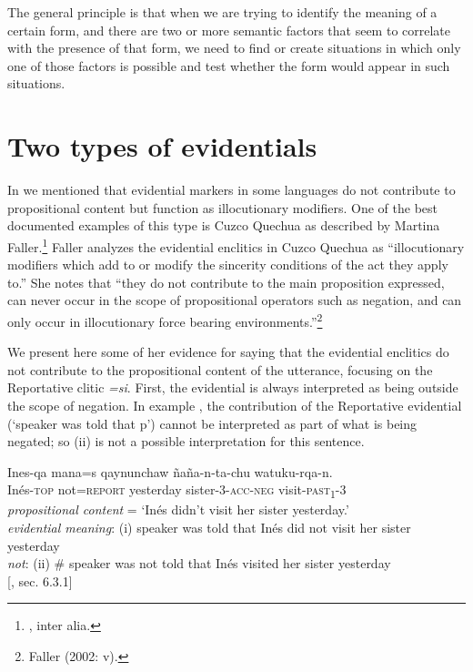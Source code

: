The general principle is that when we are trying to identify the meaning of a certain form, and there are two or more semantic factors that seem to correlate with the presence of that form, we need to find or create situations in which only one of those factors is possible and test whether the form would appear in such situations.


\section{Two types of evidentials}\label{sec:17.5}

In  we mentioned that evidential markers in some languages do not contribute to propositional content but function as illocutionary modifiers. One of the best documented examples of this type is Cuzco Quechua as described by Martina Faller.\footnote{\citet{Faller2002,Faller2003,Faller2006}, inter alia.} Faller analyzes the evidential enclitics in Cuzco Quechua as “illocutionary modifiers which add to or modify the sincerity conditions of the act they apply to.” She notes that “they do not contribute to the main proposition expressed, can never occur in the scope of propositional operators such as negation, and can only occur in illocutionary force bearing environments.”\footnote{Faller (2002: v).}



We present here some of her evidence for saying that the evidential enclitics do not contribute to the propositional content of the utterance, focusing on the Reportative clitic \textit{=si}. First, the evidential is always interpreted as being outside the scope of negation. In example , the contribution of the Reportative evidential (‘speaker was told that p’) cannot be interpreted as part of what is being negated; so (ii) is not a possible interpretation for this sentence.


\ea
\gll Ines-qa  mana=s  qaynunchaw  ñaña-n-ta-chu  watuku-rqa-n.\\
Inés-\textsc{top}  not=\textsc{report}  yesterday  sister-3-\textsc{acc-neg}  visit\textsc{-past}\textsc{\textsubscript{1}}-3\\
\glt \textit{propositional content} = ‘Inés didn’t visit her sister yesterday.’\\
\textit{evidential meaning}: (i) speaker was told that Inés did not visit her sister yesterday\\
  \textit{not}:  (ii) \# speaker was not told that Inés visited her sister yesterday\\
{}[\citealt{Faller2002}, sec. 6.3.1]
\z


